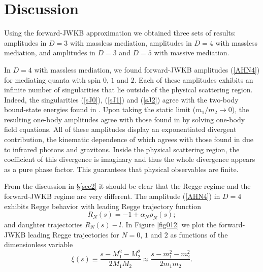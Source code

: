 \section{Discussion}
Using the forward-JWKB approximation we obtained three sets of results: amplitudes in $D = 3$ with massless mediation, amplitudes in $D = 4$ with massless mediation, and amplitudes in $D = 3$ and $D = 5$ with massive mediation.

In $D = 4$ with massless mediation, we found forward-JWKB amplitudes (\ref{AHN4}) for mediating quanta with spin $0$, $1$ and $2$. Each of these amplitudes exhibits an infinite number of singularities that lie outside of the physical scattering region. Indeed, the singularities (\ref{sJ0}), (\ref{sJ1}) and (\ref{sJ2}) agree with the two-body bound-state energies found in \cite{BIZJ,KabatOrtiz,Dittrich}. Upon taking the static limit ($m_{1} / m_{2} \rightarrow 0$), the resulting one-body amplitudes agree with those found in \cite{Singh} by solving one-body field equations. All of these amplitudes display an exponentiated divergent contribution, the kinematic dependence of which agrees with those found in \cite{Weinberg:1965nx} due to infrared photons and gravitons. Inside the physical scattering region, the coefficient of this divergence is imaginary and thus the whole divergence appears as a pure phase factor. This guarantees that physical observables are finite.

From the discussion in \S\ref{sec2} it should be clear that the Regge regime and the forward-JWKB regime are very different. The amplitude (\ref{AHN4}) in $D = 4$ exhibits Regge behavior with leading Regge trajectory function
\begin{equation}
	R_{N}(s) = -1 + \alpha_{N} \rho_{N}(s);
\end{equation}
and daughter trajectories $R_{N}(s) - l$. In Figure \ref{fig012} we plot the forward-JWKB leading Regge trajectories for $N = 0$, $1$ and $2$ as functions of the dimensionless variable
\begin{equation}
	\xi(s) \equiv \frac{s - M_{1}^{2} - M_{2}^{2}}{2 M_{1} M_{2}} \approx \frac{s - m_{1}^{2} - m_{2}^{2}}{2 m_{1} m_{2}}.
\end{equation}

